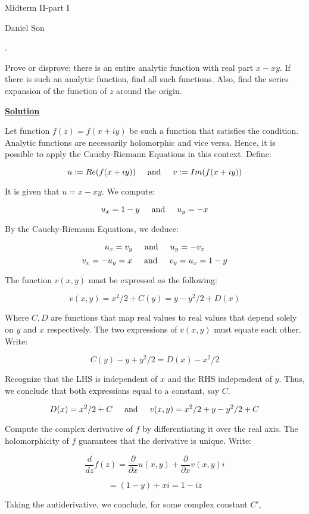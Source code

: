 \documentclass{article}
\newcommand{\new}[1]{
    \vspace{2mm}
    \noindent
    \textbf{
    \underline{#1}}
}
\newcommand{\deriv}[1]{{
    \frac{d}{d{#1}}
}
}
\newcommand{\parderiv}[1]{{
    \frac{\partial}{\partial{#1}}
}
}
\newcounter{problemcnt}
\newcommand{\Problem}{{
    \vspace{5mm}
    \stepcounter{problemcnt}
    \noindent
    \arabic{problemcnt}. 
}
}
\newcommand{\textAnd}{
    {
        \hspace{5mm}
        \textrm{and}
        \hspace{5mm}
    }
}
\begin{document}
\begin{center}
\LARGE
Midterm II-part I

\Large
Daniel Son
\end{center}

\normalsize

\Problem
Prove or disprove: there is an entire analytic function with real part 
$x-xy$. If there is such an analytic function, find all such functions. 
Also, find the series expansion of the function of $z$ around the origin. 

\new{Solution}
Let function $f(z) = f(x + iy)$ be such a function that satisfies 
the condition. 
Analytic functions are necessarily holomorphic and vice versa. Hence, 
it is possible to apply the Cauchy-Riemann Equations in this context. 
Define:

\[
    u:=Re(f(x+iy))
    \textAnd 
    v := Im(f(x+iy))
\]

It is given that $u = x-xy$. We compute:

\[
    u_x = 1-y \textAnd u_y = -x 
\]

By the Cauchy-Riemann Equations, we deduce:

\[
    u_x = v_y \textAnd u_y = -v_x 
\]
\[
    v_x = -u_y = x \textAnd v_y = u_x = 1-y
\]

The function $v(x, y)$ must be expressed as the following:

\[
    v(x, y) = x^2/2 + C(y) = y-y^2/2 + D(x)
\]

Where $C, D$ are functions that map real values to real values that 
depend solely on $y$ and $x$ respectively. The two expressions of 
$v(x, y)$ must equate each other. Write:

\[
    C(y) - y + y^2/2 = D(x)-x^2/2
\]

Recognize that the LHS is independent of $x$ and the RHS independent of $y$. 
Thus, we conclude that both expressions equal to a constant, say $C$. 

\[
    D(x) = x^2/2 + C \textAnd 
    v(x, y) = x^2/2 + y - y^2/2 + C
\]

Compute the complex derivative of $f$ by differentiating it over 
the real axis. The holomorphicity of $f$ guarantees that the derivative 
is unique. Write:

\[
    \deriv{z}f(z) = 
    \parderiv{x}u(x, y) + \parderiv{x}v(x, y) i
\]

\[
    = (1-y)+xi = 1-iz
\]

Taking the antiderivative, we conclude, for some complex constant $C'$, 
\end{document}
